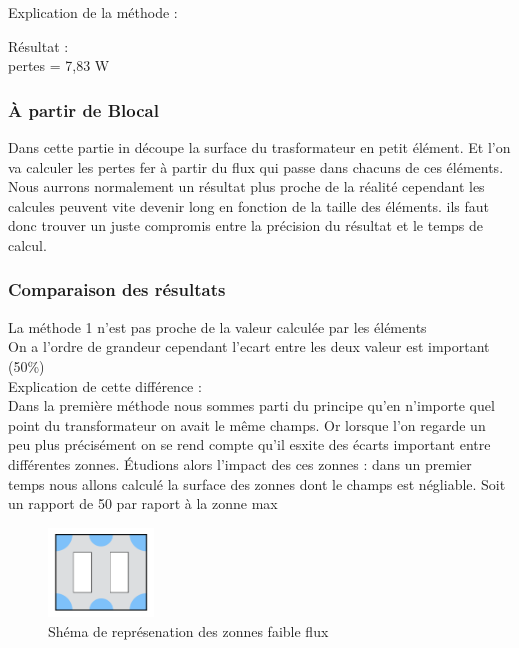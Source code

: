 Explication de la méthode : 

Résultat : \\
pertes = 7,83 W\\

\subsubsection{À partir de Blocal}
Dans cette partie in découpe la surface du trasformateur en petit élément. Et l'on va calculer les pertes fer à partir du flux qui passe dans chacuns de ces éléments. Nous aurrons normalement un résultat plus proche de la réalité cependant les calcules peuvent vite devenir long en fonction de la taille des éléments. ils faut donc trouver un juste compromis entre la précision du résultat et le temps de calcul. 




\subsubsection{Comparaison des résultats}
La méthode 1 n'est pas proche de la valeur calculée par les éléments\\
On a l'ordre de grandeur cependant l'ecart entre les deux valeur est important (50\%)\\

Explication de cette différence : \\
Dans la première méthode nous sommes parti du principe qu'en n'importe quel point du transformateur on avait le même champs. Or lorsque l'on regarde un peu plus précisément on se rend compte qu'il esxite des écarts important entre différentes zonnes.
Étudions alors l'impact des ces zonnes : dans un premier temps nous allons calculé la surface des zonnes dont le champs est négliable. Soit un rapport de 50 par raport à la zonne max

\begin{figure}
	\begin{center}
	\includegraphics[width=0.25\textwidth]{images/TP3_zones_mortes}
	\caption{Shéma de représenation des zonnes faible flux}\label{img:RepChamps}
	\end{center}
\end{figure}

